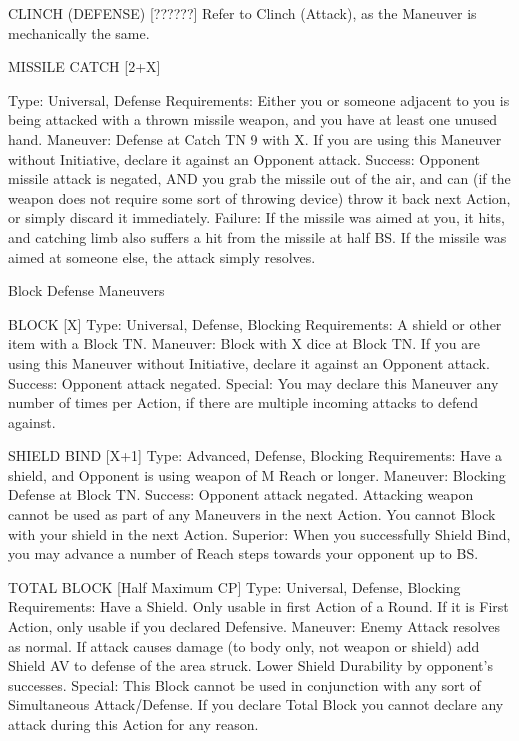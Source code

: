 \documentclass[oneside,11pt,english]{book}
\begin{document}
 

CLINCH (DEFENSE) [??????] 
Refer to Clinch (Attack), as the Maneuver is mechanically the same. 

 

MISSILE CATCH [2+X] 


Type: Universal, Defense 
Requirements: Either you or someone adjacent to you is being attacked with a thrown missile weapon, 
and you have at least one unused hand. 
Maneuver: Defense at Catch TN 9 with X. If you are using this Maneuver without Initiative, declare it 
against an Opponent attack. 
Success: Opponent missile attack is negated, AND you grab the missile out of the air, and can (if the 
weapon does not require some sort of throwing device) throw it back next Action, or simply discard it 
immediately. 
Failure: If the missile was aimed at you, it hits, and catching limb also suffers a hit from the missile at 
half BS. If the missile was aimed at someone else, the attack simply resolves. 

 

 

Block Defense Maneuvers 

 

BLOCK [X] 
Type: Universal, Defense, Blocking 
Requirements: A shield or other item with a Block TN. 
Maneuver: Block with X dice at Block TN. If you are using this Maneuver without Initiative, declare it 
against an Opponent attack. 
Success: Opponent attack negated. 
Special: You may declare this Maneuver any number of times per Action, if there are multiple incoming 
attacks to defend against. 

 

SHIELD BIND [X+1] 
Type: Advanced, Defense, Blocking 
Requirements: Have a shield, and Opponent is using weapon of M Reach or longer. 
Maneuver: Blocking Defense at Block TN. 
Success: Opponent attack negated. Attacking weapon cannot be used as part of any Maneuvers in the next 
Action. You cannot Block with your shield in the next Action. 
Superior: When you successfully Shield Bind, you may advance a number of Reach steps towards your 
opponent up to BS. 

 

TOTAL BLOCK [Half Maximum CP] 
Type: Universal, Defense, Blocking 
Requirements: Have a Shield. Only usable in first Action of a Round. If it is First Action, only usable if 
you declared Defensive. 
Maneuver: Enemy Attack resolves as normal. If attack causes damage (to body only, not weapon or 
shield) add Shield AV to defense of the area struck. 
Lower Shield Durability by opponent’s successes. 
Special: This Block cannot be used in conjunction with any sort of Simultaneous Attack/Defense. If you 
declare Total Block you cannot declare any attack during this Action for any reason. 
\end{document}
